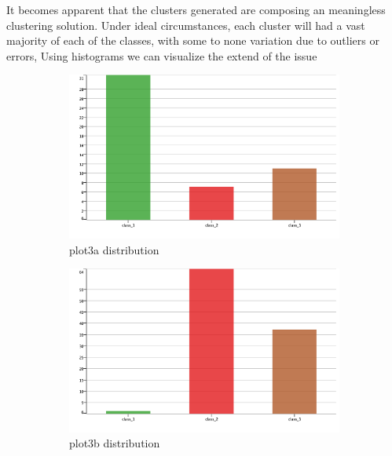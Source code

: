 \documentclass[11pt]{article}
\begin{document}
		 	\fi
			It becomes apparent that the clusters generated are composing an meaningless clustering solution. Under ideal circumstances, each cluster will had a vast majority of each of the classes, with some to none variation due to outliers or errors, Using histograms we can visualize the extend of the issue 
			\iffalse
			\begin{figure}[H]
				\centering
				\begin{subfigure}{0.4\textwidth}
			 		\includegraphics[width=\textwidth]{res/t1/t14/t14-plota-dist}
					\caption{plot3a distribution}
					\label{fig:first}
				\end{subfigure}
				\hfill
				\begin{subfigure}{0.4\textwidth}
			 		\includegraphics[width=\textwidth]{res/t1/t14/t14-plotb-dist}
					\caption{plot3b distribution}
					\label{fig:second}
				\end{subfigure}
				\hfill
				\begin{subfigure}{0.4\textwidth}

\end{subfigure}
\end{figure}
\end{document}
